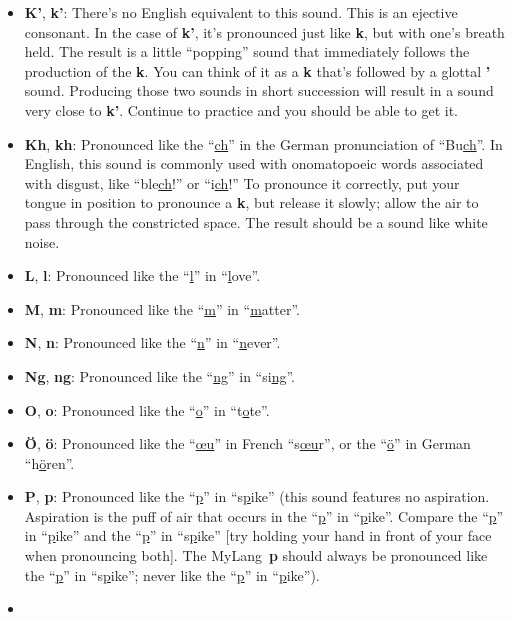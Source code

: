 \documentclass[oneside]{book}
\newcommand{\LanguageName}{MyLang}
\begin{document}
\begin{itemize}
The \LanguageName\ \textbf{k} should always be pronounced like the ``\uline{k}'' in ``s\uline{k}y'';
never like the ``\uline{k}'' in ``\uline{k}ite'').
\item
\textbf{K'}, \textbf{k'}:
There's no English equivalent to this sound.
This is an ejective consonant.
In the case of \textbf{k'}, it's pronounced just like \textbf{k}, but with one's breath held.
The result is a little ``popping'' sound that immediately follows the production of the \textbf{k}.
You can think of it as a \textbf{k} that's followed by a glottal \textbf{'} sound.
Producing those two sounds in short succession will result in a sound very close to \textbf{k'}.
Continue to practice and you should be able to get it.
\item
\textbf{Kh}, \textbf{kh}:
Pronounced like the ``\uline{ch}'' in the German pronunciation of ``Bu\uline{ch}''.
In English, this sound is commonly used with onomatopoeic words associated with disgust, like ``ble\uline{ch}!'' or ``i\uline{ch}!''
To pronounce it correctly, put your tongue in position to pronounce a \textbf{k}, but release it slowly;
allow the air to pass through the constricted space.
The result should be a sound like white noise.
\item
\textbf{L}, \textbf{l}:
Pronounced like the ``\uline{l}'' in ``\uline{l}ove''.
\item
\textbf{M}, \textbf{m}:
Pronounced like the ``\uline{m}'' in ``\uline{m}atter''.
\item
\textbf{N}, \textbf{n}:
Pronounced like the ``\uline{n}'' in ``\uline{n}ever''.
\item
\textbf{Ng}, \textbf{ng}:
Pronounced like the ``\uline{ng}'' in ``si\uline{ng}''.
\item
\textbf{O}, \textbf{o}:
Pronounced like the ``\uline{o}'' in ``t\uline{o}te''.
\item
\textbf{Ö}, \textbf{ö}:
Pronounced like the ``\uline{œu}'' in French ``s\uline{œu}r'', or the ``\uline{ö}'' in German ``h\uline{ö}ren''.
\item
\textbf{P}, \textbf{p}:
Pronounced like the ``\uline{p}'' in ``s\uline{p}ike'' (this sound features no aspiration.
Aspiration is the puff of air that occurs in the ``\uline{p}'' in ``\uline{p}ike''.
Compare the ``\uline{p}'' in ``\uline{p}ike'' and the ``\uline{p}'' in ``s\uline{p}ike'' [try holding your hand in front of your face when pronouncing both].
The \LanguageName\ \textbf{p} should always be pronounced like the ``\uline{p}'' in ``s\uline{p}ike'';
never like the ``\uline{p}'' in ``\uline{p}ike'').
\item

\end{itemize}
\end{document}
